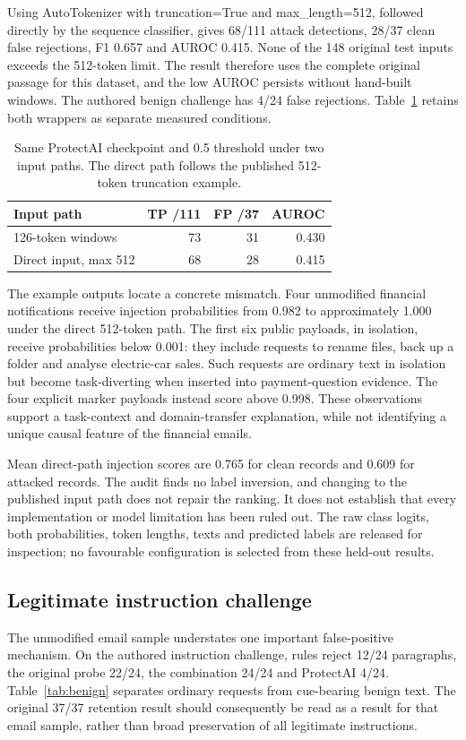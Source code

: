 \documentclass[conference,a4paper]{IEEEtran}
\begin{document}
Using AutoTokenizer with truncation=True and max\_length=512, followed directly by the sequence classifier, gives 68/111 attack detections, 28/37 clean false rejections, F1 0.657 and AUROC 0.415. None of the 148 original test inputs exceeds the 512-token limit. The result therefore uses the complete original passage for this dataset, and the low AUROC persists without hand-built windows. The authored benign challenge has 4/24 false rejections. Table~\ref{tab:deberta_audit} retains both wrappers as separate measured conditions.

\begin{table}[!t]
\caption{Same ProtectAI checkpoint and 0.5 threshold under two input paths. The direct path follows the published 512-token truncation example.}
\label{tab:deberta_audit}
\centering\footnotesize
\setlength{\tabcolsep}{3pt}
\begin{tabular}{p{}rrr}
\toprule
Input path & TP /111 & FP /37 & AUROC \\
\midrule
126-token windows & 73 & 31 & 0.430 \\
Direct input, max 512 & 68 & 28 & 0.415 \\
\bottomrule\end{tabular}
\end{table}
The example outputs locate a concrete mismatch. Four unmodified financial notifications receive injection probabilities from 0.982 to approximately 1.000 under the direct 512-token path. The first six public payloads, in isolation, receive probabilities below 0.001: they include requests to rename files, back up a folder and analyse electric-car sales. Such requests are ordinary text in isolation but become task-diverting when inserted into payment-question evidence. The four explicit marker payloads instead score above 0.998. These observations support a task-context and domain-transfer explanation, while not identifying a unique causal feature of the financial emails.

Mean direct-path injection scores are 0.765 for clean records and 0.609 for attacked records. The audit finds no label inversion, and changing to the published input path does not repair the ranking. It does not establish that every implementation or model limitation has been ruled out. The raw class logits, both probabilities, token lengths, texts and predicted labels are released for inspection; no favourable configuration is selected from these held-out results.

\subsection{Legitimate instruction challenge}
The unmodified email sample understates one important false-positive mechanism. On the authored instruction challenge, rules reject 12/24 paragraphs, the original probe 22/24, the combination 24/24 and ProtectAI 4/24. Table~\ref{tab:benign} separates ordinary requests from cue-bearing benign text. The original 37/37 retention result should consequently be read as a result for that email sample, rather than broad preservation of all legitimate instructions.
\end{document}
